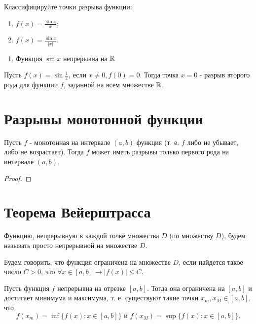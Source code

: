	\begin{example}
		Классифицируйте точки разрыва функции:
		\begin{enumerate}
			\item $f(x) = \frac{\sin{x}}{x};$
			\item $f(x) = \frac{\sin{x}}{|x|}.$
		\end{enumerate}
	\end{example}
	
	\begin{enumerate}
		\item Функция $\sin{x}$ непрерывна на $\mathbb R$
	\end{enumerate}
	
	\begin{example}
		Пусть $f(x) = \sin{\frac{1}{x}}$, если $x \neq 0, f(0) = 0$. Тогда точка $x = 0$ - разрыв второго рода для функции $f$, заданной на всем множестве $\mathbb R$.
	\end{example}
	
	\section{Разрывы монотонной функции}
	
	\begin{sentence}
		Пусть $f$ - монотонная на интервале $(a, b)$ функция (т. е. $f$ либо не убывает, либо не возрастает). Тогда $f$ может иметь разрывы только первого рода на интервале $(a, b)$.
	\end{sentence}
	
	\begin{proof}
	\end{proof}
	
	\section{Теорема Вейерштрасса}
	
	\begin{definition}
		Функцию, непрерывную в каждой точке множества $D$ (по множеству $D$), будем называть просто непрерывной на множестве $D$.
	\end{definition}
	
	\begin{definition}
		Будем говорить, что функция ограничена на множестве $D$, если найдется такое число $C > 0$, что $\forall x \in [a, b] \rightarrow |f(x)| \leqslant C$.
	\end{definition}
	
	\begin{theorem}[Вейерштрасс]
		Пусть функция $f$ непрерывна на отрезке $[a, b]$. Тогда она ограничена на $[a, b]$ и достигает минимума и максимума, т. е. существуют такие точки $x_m, x_M \in [a, b]$, что
		\[ f(x_m) = \inf\{f(x) : x \in [a, b]\} \text{ и } f(x_M) = \sup\{f(x) : x \in [a, b]\}. \]
	\end{theorem}
	
